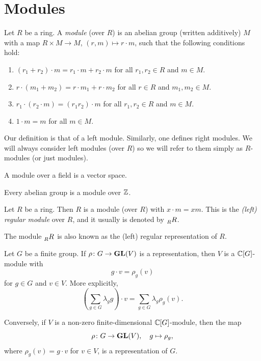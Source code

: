 \section{Modules}
\lecture\label{lec:Modules}

\begin{definition}
    Let $R$ be a ring. A \emph{module} (over $R$) is an abelian group (written additively) 
    $M$ with a map $R\times M\to M$, $(r,m)\mapsto r\cdot m$, such that
    the following conditions hold:
    \begin{enumerate}
        \item $(r_1+r_2)\cdot m=r_1\cdot m+r_2\cdot m$ for all $r_1,r_2\in R$ and $m\in M$.
		\item $r\cdot (m_1+m_2)=r\cdot m_1+r\cdot m_2$ for all $r\in R$ and $m_1,m_2\in M$.
		\item $r_1\cdot (r_2\cdot m)=(r_1r_2)\cdot m$ for all $r_1,r_2\in R$ and $m\in M$.
		\item $1\cdot m=m$ for all $m\in M$.	
    \end{enumerate}
\end{definition}

Our definition is that of a left module. Similarly, one defines right modules.
We will always consider left modules (over $R$) so we will refer to them 
simply as 
$R$-modules (or just modules).

\begin{example}
A module over a field is a vector space. 
\end{example}

\begin{example}
Every abelian group is a module over $\mathbb{Z}$.	
\end{example}

\begin{example}
\label{exa:left_regular}
Let $R$ be a ring. Then $R$ is a module (over $R$) with $x\cdot m=xm$. 
This is the \emph{(left) regular module} over $R$, and it usually 
is denoted by $\prescript{}{R}R$. 
\end{example}

The module $\prescript{}{R}R$ is also known as the (left) regular representation of $R$. 

\begin{example}
    Let $G$ be a finite group. If $\rho\colon G\to\mathbf{GL}(V)$ is a representation, 
    then $V$ is a $\mathbb{C}[G]$-module with 
    \[
    g\cdot v=\rho_g(v)
    \]
    for $g\in G$ and $v\in V$. More explicitly,
    \[
      \left(\sum_{g\in G}\lambda_g g\right)\cdot v
      =\sum_{g\in G}\lambda_g\rho_g(v).
    \]

    Conversely, if $V$ is a non-zero finite-dimensional 
    $\mathbb{C}[G]$-module, then 
    the map
    \[
    \rho\colon G\to\mathbf{GL}(V),\quad g\mapsto\rho_g,
    \]
    where $\rho_g(v)=g\cdot v$ for $v\in V$, 
    is a representation of $G$. 
\end{example}

